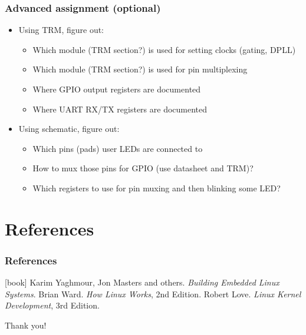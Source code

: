 \documentclass[aspectratio=169]{beamer}
\begin{document}
\begin{frame}
  \frametitle{Advanced assignment (optional)}
  \begin{itemize}
    \item Using TRM, figure out:
      \begin{itemize}
        \item Which module (TRM section?) is used for setting clocks (gating, DPLL)
        \item Which module (TRM section?) is used for pin multiplexing
        \item Where GPIO output registers are documented
        \item Where UART RX/TX registers are documented
      \end{itemize}
    \item Using schematic, figure out:
      \begin{itemize}
        \item Which pins (pads) user LEDs are connected to
        \item How to mux those pins for GPIO (use datasheet and TRM)?
        \item Which registers to use for pin muxing and then blinking some LED?
      \end{itemize}
  \end{itemize}
\end{frame}

\section*{References}

\begin{frame}
  \frametitle{References}
  \begin{thebibliography}{}
  [book]
      Karim Yaghmour, Jon Masters and others.
      \newblock \emph{Building Embedded Linux Systems}.
      Brian Ward.
      \newblock \emph{How Linux Works}, 2nd Edition.
      Robert Love.
     \newblock \emph{Linux Kernel Development}, 3rd Edition.
  \end{thebibliography}
\end{frame}

\begin{frame}[standout]
  Thank you!
\end{frame}
\end{document}

